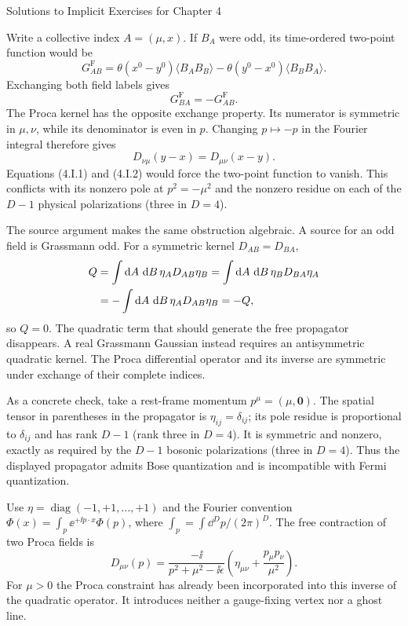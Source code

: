 \begin{bankssolutions}{Solutions to Implicit Exercises for Chapter 4}

Write a collective index $A=(\mu,x)$.  If $B_A$ were odd, its
time-ordered two-point function would be
\begin{equation*}
 G^{\mathrm F}_{AB}
 =\theta(x^0-y^0)\langle B_A B_B\rangle
 -\theta(y^0-x^0)\langle B_B B_A\rangle.
\end{equation*}
Exchanging both field labels gives
\begin{equation*}
 G^{\mathrm F}_{BA}=-G^{\mathrm F}_{AB}.
 \tag{4.I.1}
\end{equation*}
The Proca kernel has the opposite exchange property.  Its numerator is
symmetric in $\mu,\nu$, while its denominator is even in $p$.  Changing
$p\mapsto-p$ in the Fourier integral therefore gives
\begin{equation*}
 D_{\nu\mu}(y-x)=D_{\mu\nu}(x-y).
 \tag{4.I.2}
\end{equation*}
Equations (4.I.1) and (4.I.2) would force the two-point function to vanish.
This conflicts with its nonzero pole at $p^2=-\mu^2$ and the nonzero residue
on each of the $D-1$ physical polarizations (three in $D=4$).

The source argument makes the same obstruction algebraic.  A source for an
odd field is Grassmann odd.  For a symmetric kernel $D_{AB}=D_{BA}$,
\begin{align*}
 Q&=\int\mathop{}\!\mathrm{d} A\,\mathop{}\!\mathrm{d} B\,\eta_A D_{AB}\eta_B
   =\int\mathop{}\!\mathrm{d} A\,\mathop{}\!\mathrm{d} B\,\eta_B D_{BA}\eta_A\notag\\
  &=-\int\mathop{}\!\mathrm{d} A\,\mathop{}\!\mathrm{d} B\,\eta_A D_{AB}\eta_B=-Q,
\end{align*}
so $Q=0$.  The quadratic term that should generate the free propagator
disappears.  A real Grassmann Gaussian instead requires an antisymmetric
quadratic kernel.  The Proca differential operator and its inverse are
symmetric under exchange of their complete indices.

As a concrete check, take a rest-frame momentum $p^\mu=(\mu,\mathbf0)$.  The
spatial tensor in parentheses in the propagator is
$\eta_{ij}=\delta_{ij}$; its pole residue is proportional to $\delta_{ij}$
and has rank $D-1$ (rank three in $D=4$).
It is symmetric and nonzero, exactly as required by the $D-1$ bosonic
polarizations (three in $D=4$).  Thus the displayed propagator admits Bose quantization and
is incompatible with Fermi quantization.

Use $\eta=\operatorname{diag}(-1,+1,\ldots,+1)$ and the Fourier convention
$\Phi(x)=\int_p\ee^{+\ii p\cdot x}\Phi(p)$, where
$\int_p=\int\dd^D p/(2\pi)^D$.  The free contraction of two Proca fields is
\begin{equation*}
 D_{\mu\nu}(p)
 =\frac{-\ii}{p^2+\mu^2-\ii\epsilon}
 \left(\eta_{\mu\nu}+\frac{p_\mu p_\nu}{\mu^2}\right).
 \tag{4.I.3}
\end{equation*}
For $\mu>0$ the Proca constraint has already been incorporated into this
inverse of the quadratic operator.  It introduces neither a gauge-fixing
vertex nor a ghost line.


\end{bankssolutions}
